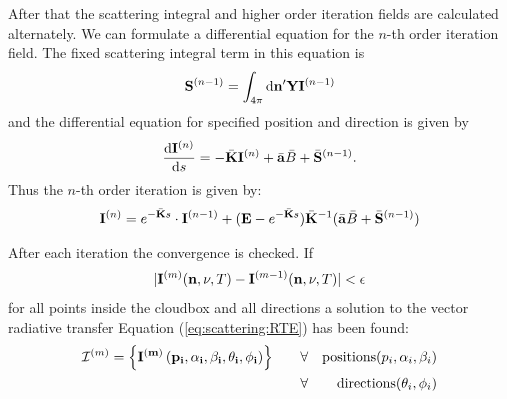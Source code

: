After that the scattering integral and higher order iteration fields
are calculated alternately. We can formulate a differential equation
for the $n$-th order iteration field. The fixed scattering integral
term in this equation is
 \begin{eqnarray}
  {\bf S}^{(n-1)} = \int_{4\pi} \mathrm{d} {\bf n}^\prime
  {\bf Y} {\bf I}^{(n-1)}
\end{eqnarray}
and the differential equation for specified position and direction is
given by
\begin{eqnarray}
     \frac{\mathrm{d} {\bf I}^{(n)}}{\mathrm{d} s} =
     -\bar{{\bf K}} {\bf I}^{(n)} + \bar{{\bf a}} \bar{B}
     +\bar{{\bf S}}^{(n-1)}.
\end{eqnarray} 
Thus the $n$-th order iteration is given by:
\begin{eqnarray}
   {\bf I}^{(n)} = e^{-\bar{{\bf K}} s}\cdot{\bf I}^{(n-1)} + ({\bf E} - e^{-\bar{{\bf K}}
    s}) \bar{{\bf K}}^{-1} (\bar{{\bf a}} \bar{B} + \bar{{\bf S}}^{(n-1)})
\end{eqnarray}



  After each iteration the convergence is checked. If
\begin{eqnarray}
|{\bf I}^{(m)} ({\bf n}, \nu, T) -  {\bf I}^{(m-1)} ({\bf n}, \nu, T)| < {\bf \epsilon}
\end{eqnarray}
for all points inside the cloudbox and all directions a solution to
the vector radiative transfer Equation (\ref{eq:scattering:RTE}) has
been found:
\begin{eqnarray}
{\mathcal I}^{(m)} = \left\{ \bf{I}^{(m)} \left( p_i, \alpha_i, \beta_i, \theta_i, \phi_i\right)\right\}  \qquad  
&\forall& {\rm positions } (p_i,\alpha_i, \beta_i)\\
&\forall& {\rm directions } (\theta_i,\phi_i)
\end{eqnarray}



